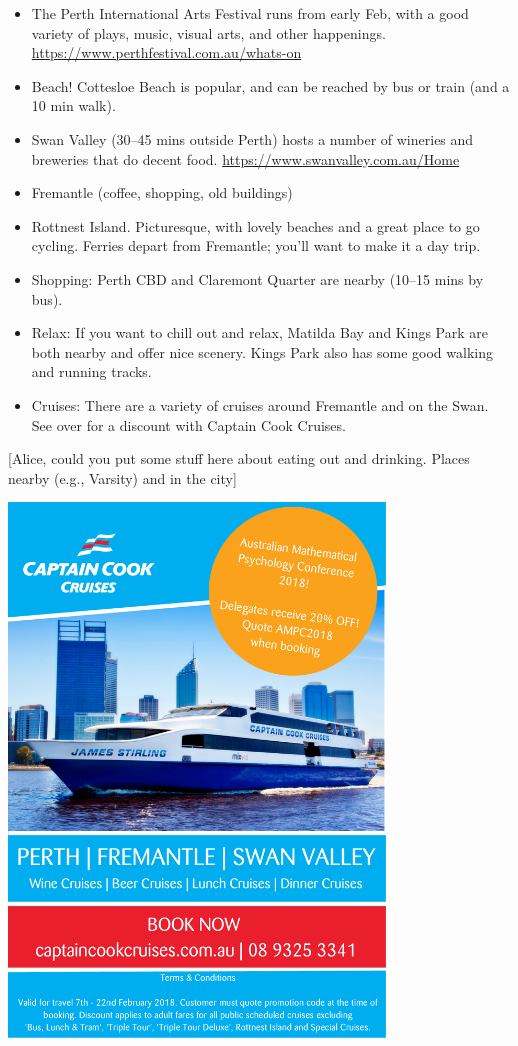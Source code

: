 \documentclass[]{article}
\providecommand{\tightlist}{%
  \setlength{\itemsep}{0pt}\setlength{\parskip}{0pt}}
\begin{document}
\begin{itemize}
\tightlist
\item
  The Perth International Arts Festival runs from early Feb, with a good
  variety of plays, music, visual arts, and other happenings.
  \url{https://www.perthfestival.com.au/whats-on}
\item
  Beach! Cottesloe Beach is popular, and can be reached by bus or train
  (and a 10 min walk).
\item
  Swan Valley (30--45 mins outside Perth) hosts a number of wineries and
  breweries that do decent food.
  \url{https://www.swanvalley.com.au/Home}
\item
  Fremantle (coffee, shopping, old buildings)
\item
  Rottnest Island. Picturesque, with lovely beaches and a great place to
  go cycling. Ferries depart from Fremantle; you'll want to make it a
  day trip.
\item
  Shopping: Perth CBD and Claremont Quarter are nearby (10--15 mins by
  bus).
\item
  Relax: If you want to chill out and relax, Matilda Bay and Kings Park
  are both nearby and offer nice scenery. Kings Park also has some good
  walking and running tracks.
\item
  Cruises: There are a variety of cruises around Fremantle and on the
  Swan. See over for a discount with Captain Cook Cruises.
\end{itemize}

{[}Alice, could you put some stuff here about eating out and drinking.
Places nearby (e.g., Varsity) and in the city{]}

\begin{center}
\includegraphics[width=10cm]{images/CCC.pdf}
\end{center}
\end{document}
